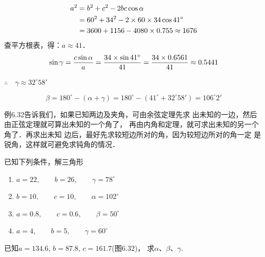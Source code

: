 \begin{solution}
\[\begin{split}
    a^2&=b^2+c^2-2bc\cos\alpha\\
&=60^2+34^2-2\times60\times34\cos41^{\circ}\\
&=3600+1156-4080\times0.755\approx 1676
\end{split}\]
查平方根表，得：$a\approx 41$．
\[\sin\gamma=\dfrac{c\sin\alpha}{a}=\dfrac{34\times\sin41^{\circ}}{41}=\dfrac{34\times 0.6561}{41}\approx 0.5441\]

$\therefore\quad \gamma\approx 32^{\circ}58'$

\[\beta=180^{\circ}-(\alpha+\gamma)
=180^{\circ}-(41^{\circ}+32^{\circ}58')
=106^{\circ}2'\]    
\end{solution}


例6.32告诉我们，如果已知两边及夹角，可由余弦定理先求
出未知的一边，然后由正弦定理就可算出未知的一个角了，
再由内角和定理，就可求出未知的另一个角了．再求出未知
边后，最好先求较短边所对的角，因为较短边所对的角一定
是锐角，这样就可避免求钝角的情况．

\begin{ex}
    已知下列条件，解三角形
\begin{enumerate}
\item  $a=22,\qquad b=26,\qquad \gamma=78^{\circ}$
\item  $b=10,\qquad c=10,\qquad \alpha=102^{\circ}$
\item  $a=0.8,\qquad c=0.6,\qquad \beta=50^{\circ}$
\item  $a=4,\qquad b=5,\qquad \gamma=60^{\circ}$
\end{enumerate}
\end{ex}

\begin{example}
    已知$a=134.6$, $b=87.8$, $c=161.7$(图6.32)，
    求$\alpha$、$\beta$、$\gamma$.
\end{example}

\begin{figure}[htp]
    \centering
{}
    \caption{}
\end{figure}

